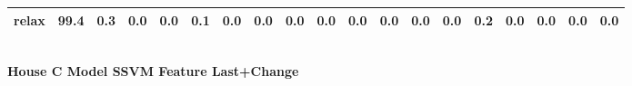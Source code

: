 \documentclass{article}
\begin{document}
\begin{sideways}
\begin{tabular}{lrrrrrrrrrrrrrrrrrr}
relax                         &        99.4 &                0.3 &           0.0 &                          0.0 &                0.1 &                0.0 &                        0.0 &          0.0 &              0.0 &                0.0 &                    0.0 &                      0.0 &                  0.0 &                   0.2 &              0.0 &              0.0 &                                  0.0 &          0.0 \\
\bottomrule
\end{tabular}
\end{sideways}
\normalsize
\vspace{1cm}\\
\textbf{House C Model SSVM Feature Last+Change}\\
\vspace{1cm}\\
\end{document}
